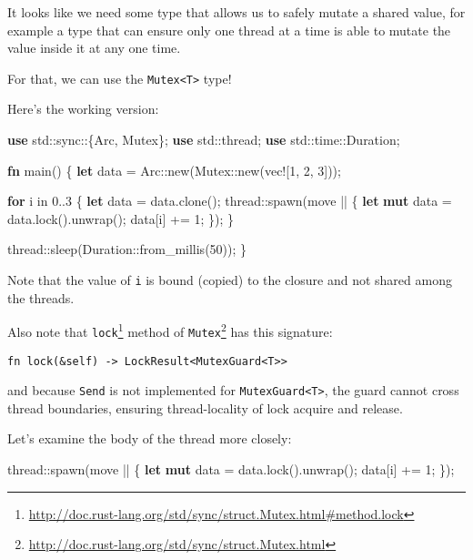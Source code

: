 \documentclass[a4paper,]{book}
\newenvironment{Shaded}{\begin{snugshade}}{\end{snugshade}}
\newcommand{\KeywordTok}[1]{\textcolor[rgb]{0.13,0.29,0.53}{\textbf{{#1}}}}
\newcommand{\DecValTok}[1]{\textcolor[rgb]{0.00,0.00,0.81}{{#1}}}
\newcommand{\OtherTok}[1]{\textcolor[rgb]{0.56,0.35,0.01}{{#1}}}
\newcommand{\NormalTok}[1]{{#1}}
\renewcommand{\href}[2]{#2\footnote{\url{#1}}}
\begin{document}
It looks like we need some type that allows us to safely mutate a shared
value, for example a type that can ensure only one thread at a time is
able to mutate the value inside it at any one time.

For that, we can use the \texttt{Mutex\textless{}T\textgreater{}} type!

Here's the working version:

\begin{Shaded}
\begin{Highlighting}[]
\KeywordTok{use} \NormalTok{std::sync::\{Arc, Mutex\};}
\KeywordTok{use} \NormalTok{std::thread;}
\KeywordTok{use} \NormalTok{std::time::Duration;}

\KeywordTok{fn} \NormalTok{main() \{}
    \KeywordTok{let} \NormalTok{data = Arc::new(Mutex::new(}\OtherTok{vec!}\NormalTok{[}\DecValTok{1}\NormalTok{, }\DecValTok{2}\NormalTok{, }\DecValTok{3}\NormalTok{]));}

    \KeywordTok{for} \NormalTok{i in }\DecValTok{0.}\NormalTok{.}\DecValTok{3} \NormalTok{\{}
        \KeywordTok{let} \NormalTok{data = data.clone();}
        \NormalTok{thread::spawn(move || \{}
            \KeywordTok{let} \KeywordTok{mut} \NormalTok{data = data.lock().unwrap();}
            \NormalTok{data[i] += }\DecValTok{1}\NormalTok{;}
        \NormalTok{\});}
    \NormalTok{\}}

    \NormalTok{thread::sleep(Duration::from_millis(}\DecValTok{50}\NormalTok{));}
\NormalTok{\}}
\end{Highlighting}
\end{Shaded}

Note that the value of \texttt{i} is bound (copied) to the closure and
not shared among the threads.

Also note that
\href{http://doc.rust-lang.org/std/sync/struct.Mutex.html\#method.lock}{\texttt{lock}}
method of
\href{http://doc.rust-lang.org/std/sync/struct.Mutex.html}{\texttt{Mutex}}
has this signature:

\begin{verbatim}
fn lock(&self) -> LockResult<MutexGuard<T>>
\end{verbatim}

and because \texttt{Send} is not implemented for
\texttt{MutexGuard\textless{}T\textgreater{}}, the guard cannot cross
thread boundaries, ensuring thread-locality of lock acquire and release.

Let's examine the body of the thread more closely:

\begin{Shaded}
\begin{Highlighting}[]
\NormalTok{thread::spawn(move || \{}
    \KeywordTok{let} \KeywordTok{mut} \NormalTok{data = data.lock().unwrap();}
    \NormalTok{data[i] += }\DecValTok{1}\NormalTok{;}
\NormalTok{\});}
\end{Highlighting}
\end{Shaded}
\end{document}
